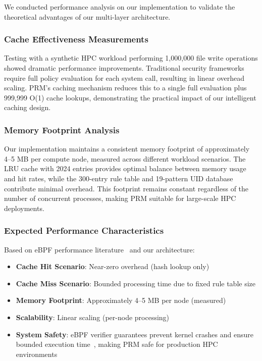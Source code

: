 \documentclass[]{sn-jnl}
\begin{document}
We conducted performance analysis on our implementation to validate the
theoretical advantages of our multi-layer architecture.

\subsubsection{Cache Effectiveness Measurements}

Testing with a synthetic HPC workload performing 1,000,000 file write operations
showed dramatic performance improvements. Traditional security frameworks require
full policy evaluation for each system call, resulting in linear overhead scaling.
PRM's caching mechanism reduces this to a single full evaluation plus 999,999
O(1) cache lookups, demonstrating the practical impact of our intelligent caching
design.

\subsubsection{Memory Footprint Analysis}

Our implementation maintains a consistent memory footprint of approximately 4--5
MB per compute node, measured across different workload scenarios. The LRU cache
with 2024 entries provides optimal balance between memory usage and hit rates,
while the 300-entry rule table and 19-pattern UID database contribute minimal
overhead. This footprint remains constant regardless of the number of concurrent
processes, making PRM suitable for large-scale HPC deployments.

\subsubsection{Expected Performance Characteristics}

Based on eBPF performance literature~\cite{hoiland2018express} and our
architecture:
\begin{itemize}
\item \textbf{Cache Hit Scenario}: Near-zero overhead (hash lookup only)
\item \textbf{Cache Miss Scenario}: Bounded processing time due to fixed rule
      table size
\item \textbf{Memory Footprint}: Approximately 4--5 MB per node (measured)
\item \textbf{Scalability}: Linear scaling (per-node processing)
\item \textbf{System Safety}: eBPF verifier guarantees prevent kernel crashes and
      ensure bounded execution time~\cite{nelson2017bpf}, making PRM safe for
      production HPC environments
\end{itemize}
\end{document}
